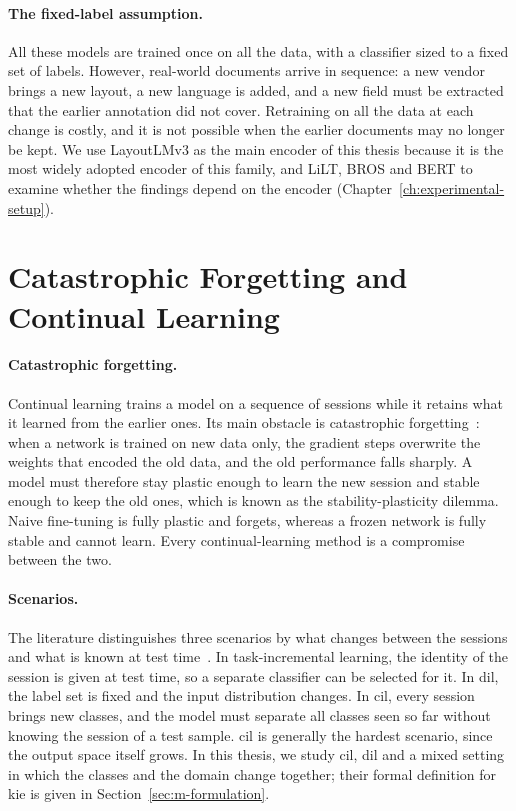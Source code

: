 \paragraph{The fixed-label assumption.} All these models are trained once on all the data,
with a classifier sized to a fixed set of labels. However, real-world documents arrive in
sequence: a new vendor brings a new layout, a new language is added, and a new field must
be extracted that the earlier annotation did not cover. Retraining on all the data at each
change is costly, and it is not possible when the earlier documents may no longer be kept.
We use LayoutLMv3 as the main encoder of this thesis because it is the most widely adopted
encoder of this family, and LiLT, BROS and BERT to examine whether the findings depend on
the encoder (Chapter~\ref{ch:experimental-setup}).

\section{Catastrophic Forgetting and Continual Learning}
\label{sec:c2-s2}

\paragraph{Catastrophic forgetting.} Continual learning trains a model on a sequence of
sessions while it retains what it learned from the earlier ones. Its main obstacle is
catastrophic forgetting~\citep{mccloskey1989catastrophic}: when a network is trained on
new data only, the gradient steps overwrite the weights that encoded the old data, and the
old performance falls sharply. A model must therefore stay plastic enough to learn the new
session and stable enough to keep the old ones, which is known as the stability-plasticity
dilemma. Naive fine-tuning is fully plastic and forgets, whereas a frozen network is fully
stable and cannot learn. Every continual-learning method is a compromise between the two.

\paragraph{Scenarios.} The literature distinguishes three scenarios by what changes between
the sessions and what is known at test time~\citep{wang2024survey,masana2022class}. In
task-incremental learning, the identity of the session is given at test time, so a separate
classifier can be selected for it. In \gls{dil}, the label set is fixed and the input
distribution changes. In \gls{cil}, every session brings new classes, and the model must
separate all classes seen so far without knowing the session of a test sample. \Gls{cil}
is generally the hardest scenario, since the output space itself grows. In this thesis, we
study \gls{cil}, \gls{dil} and a mixed setting in which the classes and the domain change
together; their formal definition for \gls{kie} is given in
Section~\ref{sec:m-formulation}.

